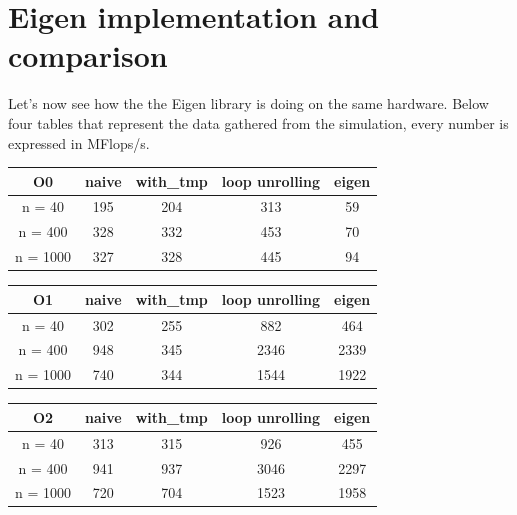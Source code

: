 \documentclass[11pt,a4paper,oneside,titlepage,openright]{book}
\begin{document}
\chapter{Eigen implementation and comparison}

Let's now see how the the Eigen library is doing on the same hardware. 
Below four tables that represent the data gathered from the simulation, every number is expressed in MFlops/s.

\begin{center}
 \begin{tabular}{|c c c c c |} 
 \hline
 O0 & naive   & with\_tmp & loop unrolling & eigen \\ [0.5ex] 
 \hline
 n = 40 & 195   & 204       & 313          & 59    \\ 
 \hline
 n = 400 & 328   & 332       & 453                 & 70       \\
 \hline
 n = 1000 & 327  & 328    &  445            & 94   \\
 \hline
\end{tabular}
\end{center}


\begin{center}
 \begin{tabular}{|c c c c c |} 
 \hline
 O1 & naive & with\_tmp & loop unrolling & eigen \\ [0.5ex] 
 \hline
 n = 40 & 302 &  255 & 882  & 464\\ 
 \hline
 n = 400 & 948 & 345 & 2346 & 2339\\
 \hline
 n = 1000 & 740 & 344 & 1544 & 1922\\
 \hline
\end{tabular}
\end{center}

\begin{center}
 \begin{tabular}{|c c c c c |} 
 \hline
 O2 & naive & with\_tmp & loop unrolling & eigen \\ [0.5ex] 
 \hline
 n = 40 & 313 & 315 & 926  & 455\\ 
 \hline
 n = 400 & 941 & 937 & 3046 & 2297\\
 \hline
 n = 1000 & 720 & 704 & 1523 & 1958\\
 \hline
\end{tabular}
\end{center}
\end{document}
